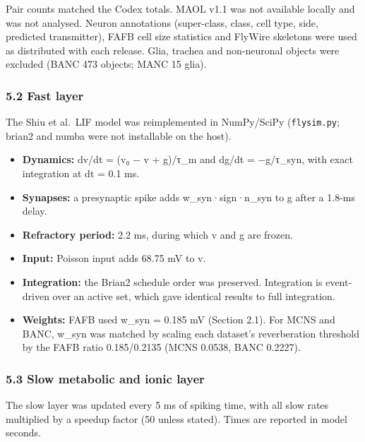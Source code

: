 \documentclass[11pt]{article}
\providecommand{\tightlist}{\setlength{\itemsep}{0pt}\setlength{\parskip}{0pt}}
\begin{document}
Pair counts matched the Codex totals. MAOL v1.1 \cite{nern2025} was not available locally and was not analysed. Neuron annotations (super-class, class, cell type, side, predicted transmitter), FAFB cell size statistics and FlyWire skeletons were used as distributed with each release. Glia, trachea and non-neuronal objects were excluded (BANC 473 objects; MANC 15 glia).

\subsubsection{5.2 Fast layer}\label{fast-layer}

The Shiu et al.~LIF model \cite{shiu2024} was reimplemented in NumPy/SciPy (\texttt{flysim.py}; brian2 and numba were not installable on the host).

\begin{itemize}
\tightlist
\item
  \textbf{Dynamics:} dv/dt = (v₀ − v + g)/τ\_m and dg/dt = −g/τ\_syn, with exact integration at dt = 0.1 ms.
\item
  \textbf{Synapses:} a presynaptic spike adds w\_syn·sign·n\_syn to g after a 1.8-ms delay.
\item
  \textbf{Refractory period:} 2.2 ms, during which v and g are frozen.
\item
  \textbf{Input:} Poisson input adds 68.75 mV to v.
\item
  \textbf{Integration:} the Brian2 schedule order was preserved. Integration is event-driven over an active set, which gave identical results to full integration.
\item
  \textbf{Weights:} FAFB used w\_syn = 0.185 mV (Section 2.1). For MCNS and BANC, w\_syn was matched by scaling each dataset's reverberation threshold by the FAFB ratio 0.185/0.2135 (MCNS 0.0538, BANC 0.2227).
\end{itemize}

\subsubsection{5.3 Slow metabolic and ionic layer}\label{slow-metabolic-and-ionic-layer}

The slow layer was updated every 5 ms of spiking time, with all slow rates multiplied by a speedup factor (50 unless stated). Times are reported in model seconds.
\end{document}

